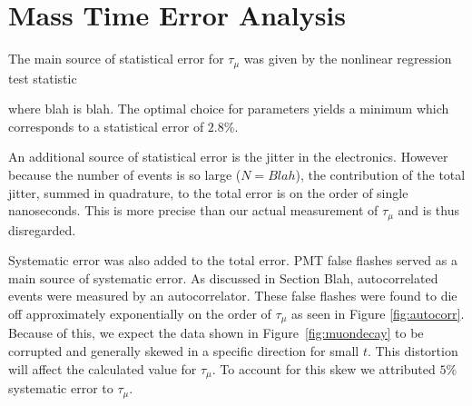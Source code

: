 
\section{Mass Time Error Analysis}\label{masstimeerroranalysis}

The main source of statistical error for $\tau_{\mu}$ was given by the nonlinear regression test statistic

where blah is blah.  The optimal choice for parameters yields a minimum which corresponds to a statistical error of $2.8\%$.  

An additional source of statistical error is the jitter in the electronics.  However because the number of events is so large ($N=Blah$), the contribution of the total jitter, summed in quadrature, to the total error is on the order of single nanoseconds.  This is more precise than our actual measurement of $\tau_{\mu}$ and is thus disregarded. 
 
Systematic error was also added to the total error.  PMT false flashes served as a main source of systematic error.  As discussed in Section Blah, autocorrelated events were measured by an autocorrelator. These false flashes were found to die off approximately exponentially on the order of $\tau_{\mu}$ as seen in Figure \ref{fig:autocorr}.  Because of this, we expect the data shown in Figure~\ref{fig:muondecay} to be corrupted and generally skewed in a specific direction for small $t$.  This distortion will affect the calculated value for $\tau_{\mu}$.  To account for this skew we attributed $5\%$ systematic error to $\tau_{\mu}$.

